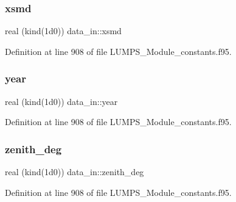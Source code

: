 \subsubsection{\texorpdfstring{xsmd}{xsmd}}
{\footnotesize\ttfamily real (kind(1d0)) data\+\_\+in\+::xsmd}



Definition at line 908 of file L\+U\+M\+P\+S\+\_\+\+Module\+\_\+constants.\+f95.

\mbox{\label{namespacedata__in_a491ee3189141ae36fd29fde5cc020b53}} 
\subsubsection{\texorpdfstring{year}{year}}
{\footnotesize\ttfamily real (kind(1d0)) data\+\_\+in\+::year}



Definition at line 908 of file L\+U\+M\+P\+S\+\_\+\+Module\+\_\+constants.\+f95.

\mbox{\label{namespacedata__in_a332530944dd5c37316f92c3c74350e83}} 
\subsubsection{\texorpdfstring{zenith\+\_\+deg}{zenith\_deg}}
{\footnotesize\ttfamily real (kind(1d0)) data\+\_\+in\+::zenith\+\_\+deg}



Definition at line 908 of file L\+U\+M\+P\+S\+\_\+\+Module\+\_\+constants.\+f95.


